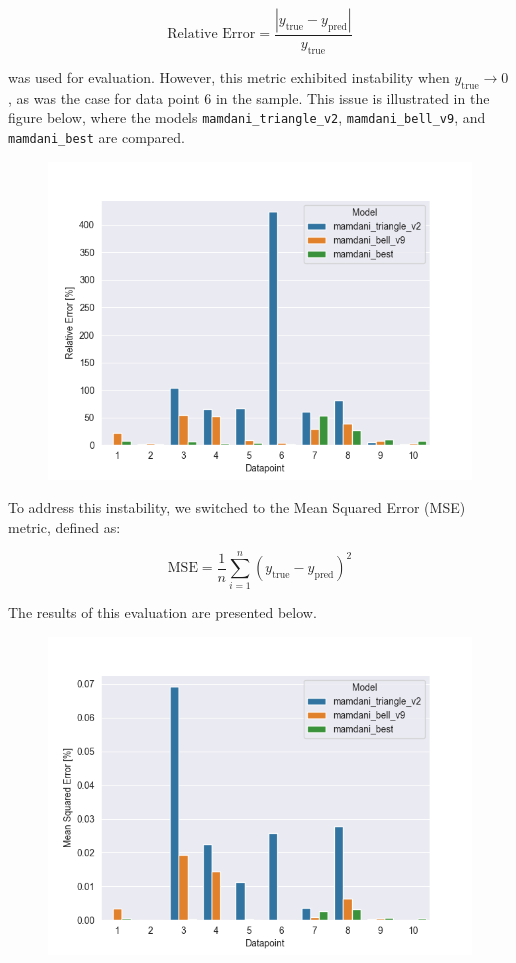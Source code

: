 \documentclass[titlepage]{article}
\begin{document}
\[
    \text{Relative Error} = \frac{|y_{\text{true}} - y_{\text{pred}}|}{y_{\text{true}}}
\]

was used for evaluation.
However, this metric exhibited instability when $y_{\text{true}} \to 0$, as was the case for data point 6 in the sample.
This issue is illustrated in the figure below, where the models \texttt{mamdani\_triangle\_v2}, \texttt{mamdani\_bell\_v9}, and \texttt{mamdani\_best} are compared.

\begin{figure}[htpb]
\includegraphics[width=\textwidth]{../images/eval_models/relative_error}
\end{figure}

To address this instability, we switched to the Mean Squared Error (MSE) metric, defined as:

\[
    \text{MSE} = \frac{1}{n} \sum_{i=1}^{n} (y_{\text{true}} - y_{\text{pred}})^2
\]

The results of this evaluation are presented below.

\begin{figure}[H]
\includegraphics[width=\textwidth]{../images/eval_models/mse}
\end{figure}
\end{document}
